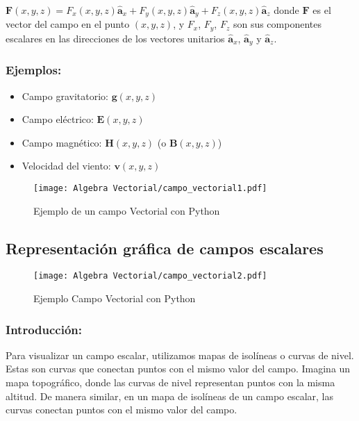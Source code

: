 \documentclass{book}
\begin{document}
$\mathbf{F}(x, y, z) = F_x(x, y, z) \mathbf{\hat{a}}_x + F_y(x, y, z) \mathbf{\hat{a}}_y + F_z(x, y, z) \mathbf{\hat{a}}_z$ donde $\mathbf{F}$ es el vector del campo en el punto $(x, y, z)$, y $F_x$, $F_y$, $F_z$ son sus componentes escalares en las direcciones de los vectores unitarios $\mathbf{\hat{a}}_x$, $\mathbf{\hat{a}}_y$ y $\mathbf{\hat{a}}_z$.

\subsubsection{Ejemplos:}
\begin{itemize}
    \item [\textbullet]Campo gravitatorio: $\mathbf{g}(x, y, z)$
    \item [\textbullet]Campo eléctrico: $\mathbf{E}(x, y, z)$
    \item [\textbullet]Campo magnético: $\mathbf{H}(x, y, z)$ (o $\mathbf{B}(x, y, z)$)
    \item [\textbullet]Velocidad del viento: $\mathbf{v}(x, y, z)$
\end{itemize}

\begin{figure} [h!]
    \centering
    \texttt{[image: Algebra Vectorial/campo\_vectorial1.pdf]}
    \caption{Ejemplo de un campo Vectorial con Python}
    \label{fig: campo_vectorial1}
\end{figure}
\subsection{Representación gráfica de campos escalares}

\begin{figure} [h!]
    \centering
    \texttt{[image: Algebra Vectorial/campo\_vectorial2.pdf]}
    \caption{Ejemplo Campo Vectorial con Python}
    \label{fig:campo_vectorial2}
\end{figure}

\subsubsection{Introducción:}

Para visualizar un campo escalar, utilizamos mapas de isolíneas o curvas de nivel. Estas son curvas que conectan puntos con el mismo valor del campo. Imagina un mapa topográfico, donde las curvas de nivel representan puntos con la misma altitud. De manera similar, en un mapa de isolíneas de un campo escalar, las curvas conectan puntos con el mismo valor del campo.
\end{document}
